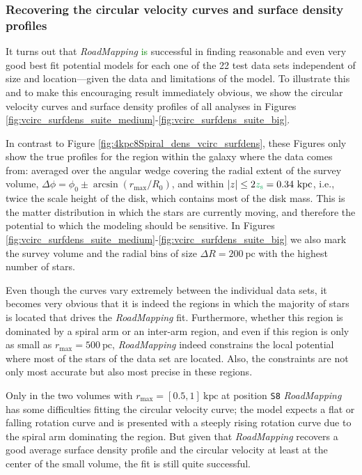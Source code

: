 \documentclass[iop,revtex4,numberedappendix,appendixfloats]{emulateapj}
\newcommand{\RM}{{\sl RoadMapping}}
\newcommand{\NEW}[1]{\textcolor{Green}{#1}}
\newcommand{\OLD}[1]{}
\begin{document}
\subsubsection{Recovering the circular velocity curves and surface density profiles} \label{sec:circvel_surfdens}

It turns out that \RM{} \OLD{was}\NEW{is} successful in finding reasonable and even very good best fit potential models for each one of the 22 test data sets independent of size and location---given the data and limitations of the model. To illustrate this and to make this encouraging result immediately obvious, we \OLD{explicitly} show the circular velocity curves and surface density profiles of all analyses in Figures \ref{fig:vcirc_surfdens_suite_medium}-\ref{fig:vcirc_surfdens_suite_big}. 

In contrast to Figure \OLD{\ref{fig:4kpc8Spiral_vcirc_surfdens}}\NEW{\ref{fig:4kpc8Spiral_dens_vcirc_surfdens}}, these Figures only show the true profiles for the region within the galaxy where the data comes from: averaged over the angular wedge covering the radial extent of the survey volume, $\Delta \phi = \phi_0 \pm \arcsin(r_\text{max}/R_0)$, and within $|z| \leq 2 \OLD{\cdot h_z}\NEW{z_\text{s}} = 0.34~\text{kpc}$, i.e., twice the scale height of the disk, which contains most of the disk mass. This is the matter distribution in which the stars are currently moving, and therefore the potential to which the modeling should be sensitive. In Figures \ref{fig:vcirc_surfdens_suite_medium}-\ref{fig:vcirc_surfdens_suite_big} we also mark the survey volume and the radial bins of size $\Delta R =200~\text{pc}$ with the highest number of stars. 

Even though the curves vary extremely between the individual data sets, it becomes very obvious that it is indeed the regions in which the majority of stars is located that drives the \RM{} fit. Furthermore, whether this region is dominated by a spiral arm or an inter-arm region, and even if this region is only as small as $r_\text{max}=500~\text{pc}$, \RM{} indeed constrains the local potential where most of the stars of the data set are located. Also, the constraints are not only most accurate but also most precise in these regions.

Only in the two volumes with $r_\text{max}=[0.5,1]~\text{kpc}$ at position \texttt{S8} \RM{} has some difficulties fitting the circular velocity curve; the model expects a flat or falling rotation curve and is presented with a steeply rising rotation curve due to the spiral arm dominating the region. But given that \RM{} recovers a good average surface density profile and the circular velocity at least at the center of the small volume, the fit is still quite successful. 
\end{document}
